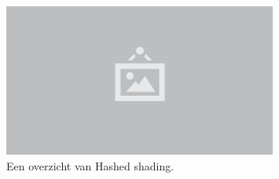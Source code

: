 \begin{figure}
  \centering
  \includegraphics[width=0.8\textwidth]{./img/raw/placeholder.png}
  \caption{Een overzicht van Hashed shading.}
  \label{fig:hs-overzicht}
\end{figure}
